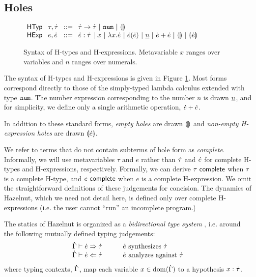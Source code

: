 \documentclass{llncs}
\begin{document}
\subsection{Holes}\label{sec:holes}
\begin{figure}[t]
$\arraycolsep=4pt\begin{array}{lllllll}
\mathsf{HTyp} & \tau,\htau & ::= &
  \tarr{\htau}{\htau} ~\vert~
  \tnum ~\vert~
  \tehole\\
\mathsf{HExp} & e,\hexp & ::= &
  \hexp : \htau ~\vert~
  x ~\vert~
  \hlam{x}{\hexp} ~\vert~
  \hap{\hexp}{\hexp} ~\vert~
  \hnum{n} ~\vert~
  \hadd{\hexp}{\hexp} ~\vert~
  \hehole ~\vert~
  \hhole{\hexp}
\end{array}$
\caption{Syntax of H-types and H-expressions. Metavariable $x$ ranges over variables and $n$ ranges over numerals.}
\label{fig:hexp-syntax}
\end{figure}

The syntax of H-types and H-expressions is given in Figure \ref{fig:hexp-syntax}. Most forms correspond directly to those of the simply-typed lambda calculus extended with type $\texttt{num}$. The number expression corresponding to the number $n$ is drawn $\underline{n}$, and for simplicity, we define only a single arithmetic operation, $\dot{e} + \dot{e}$.

In addition to these standard forms, \emph{empty holes} are drawn $\llparenthesis\rrparenthesis$ and \emph{non-empty H-expression holes} are drawn $\llparenthesis\dot{e}\rrparenthesis$. %

We refer to terms that do not contain subterms of hole form as \emph{complete}. Informally, we will use metavariables $\tau$ and $e$ rather than $\dot{\tau}$ and $\dot{e}$ for complete H-types and H-expressions, respectively. Formally, we can derive $\tau~\mathsf{complete}$ when $\tau$ is a complete H-type, and $e~\mathsf{complete}$ when $e$ is a complete H-expression. We omit the straightforward definitions of these judgements for concision. The dynamics of Hazelnut, which we need not detail here, is defined only  over complete H-expressions (i.e. the user cannot ``run'' an incomplete program.)

The statics of Hazelnut is organized as a \emph{bidirectional type system} \cite{Pierce:2000:LTI:345099.345100}, i.e. around the following mutually defined typing judgements:
\[\arraycolsep=15pt\begin{array}{ll}
\hsyn{\hGamma}{\hexp}{\htau} & \text{$\hexp$ synthesizes $\htau$}\\
\hana{\hGamma}{\hexp}{\htau} & \text{$\hexp$ analyzes against $\htau$}
\end{array}\]
where typing contexts, $\dot{\Gamma}$, map each variable $x \in \text{dom}(\dot{\Gamma})$ to a hypothesis $x : \dot{\tau}$.
\end{document}
